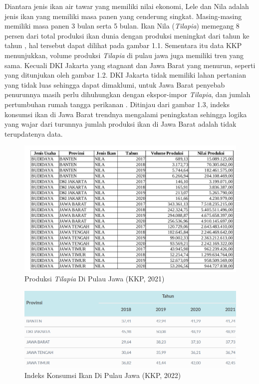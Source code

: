 Diantara jenis ikan air tawar yang memiliki nilai ekonomi, Lele dan Nila adalah jenis ikan yang memiliki masa panen yang cenderung singkat. Masing-masing memiliki masa panen 3 bulan serta 5 bulan. Ikan Nila (\textit{Tilapia}) memegang 8 persen dari total produksi ikan dunia dengan produksi meningkat dari tahun ke tahun \citep{fattah2020}, hal tersebut dapat dilihat pada gambar 1.1. Sementara itu data KKP menunjukkan, volume produksi \textit{Tilapia} di pulau jawa juga memiliki tren yang sama. Kecuali DKI Jakarta yang stagnant dan Jawa Barat yang menurun, seperti yang ditunjukan oleh gambar 1.2. DKI Jakarta tidak memiliki lahan pertanian yang tidak luas sehingga dapat dimaklumi, untuk Jawa Barat penyebab penurunnya masih perlu dihuhungkan dengan ekspor-impor \textit{Tilapia}, dan jumlah pertumbuhan rumah tangga perikanan \citep{kkp2022}. Ditinjau dari gambar 1.3, indeks konsumsi ikan di Jawa Barat trendnya mengalami peningkatan sehingga logika yang wajar dari turunnya jumlah produksi ikan di Jawa Barat adalah tidak terupdatenya data.

\begin{figure}[H]
	\centering
	\includegraphics[keepaspectratio, width=13cm]{gambar/produksi_tilapia_jawa}
	\caption{Produksi \emph{Tilapia} Di Pulau Jawa (KKP, 2021)}
	\label{gambar:produksi_tilapia_jawa}
\end{figure}
\begin{figure}[H]
	\centering
	\includegraphics[keepaspectratio, width=12cm]{gambar/indeks_konsumsi_ikan2}
	\caption{Indeks Konsumsi Ikan Di Pulau Jawa (KKP, 2022)}
	\label{gambar:indeks_konsumsi_ikan2}
\end{figure}

